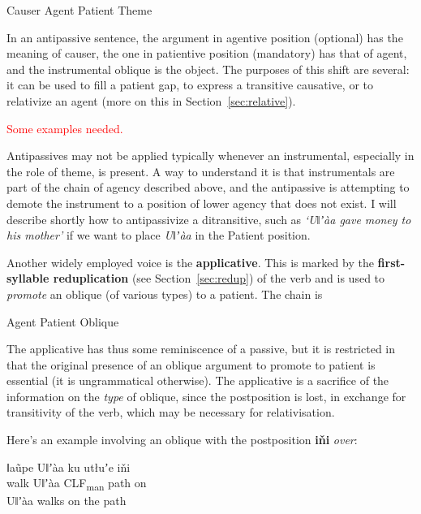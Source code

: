 \documentclass[11pt]{book}
\newcommand{\qcn}[1]{\textbf{#1}}
\newcommand{\transl}[2]{\qcn{#1} \emph{#2}}
\newcommand{\grammsc}[1]{\textsc{#1}}
\newcommand{\CLF}[1]{\grammsc{CLF}\textsubscript{#1}}
\newcommand{\cmnt}[1]{\textcolor{red}{#1}}
\begin{document}
\begin{center}
	Causer \textrightarrow Agent \textrightarrow Patient \textrightarrow Theme
\end{center}

In an antipassive sentence, the argument in agentive position (optional) has the meaning of causer, the one in patientive position (mandatory) has that of agent, and the instrumental oblique is the object. The purposes of this shift are several: it can be used to fill a patient gap, to express a transitive causative, or to relativize an agent (more on this in Section~\ref{sec:relative}).

\cmnt{Some examples needed.}

Antipassives may not be applied typically whenever an instrumental, especially in the role of theme, is present. A way to understand it is that instrumentals are part of the chain of agency described above, and the antipassive is attempting to demote the instrument to a position of lower agency that does not exist. I will describe shortly how to antipassivize a ditransitive, such as \emph{`Uǁʼàa gave money to his mother'} if we want to place \emph{Uǁʼàa} in the Patient position.

Another widely employed voice is the \textbf{applicative}. This is marked by the \textbf{first-syllable reduplication} (see Section~\ref{sec:redup}) of the verb and is used to \emph{promote} an oblique (of various types) to a patient. The chain is

\begin{center}
	Agent \textleftarrow Patient \textleftarrow Oblique
\end{center}

The applicative has thus some reminiscence of a passive, but it is restricted in that the original presence of an oblique argument to promote to patient is essential (it is ungrammatical otherwise). The applicative is a sacrifice of the information on the \emph{type} of oblique, since the postposition is lost, in exchange for transitivity of the verb, which may be necessary for relativisation.

Here's an example involving an oblique with the postposition \transl{iňi}{over}:

\begin{exe}
\ex
\gll ǁaũpe Uǁʼàa ku utłuʼe iňi\\
walk Uǁʼàa \CLF{man} path on\\
\glt Uǁʼàa walks on the path
\end{exe}
\end{document}
